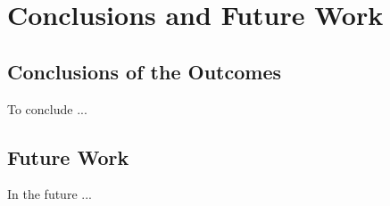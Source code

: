 \chapter{Conclusions and Future Work} 
\label{Chapter5} 

\section{Conclusions of the Outcomes}
To conclude ...

\section{Future Work}

In the future ...